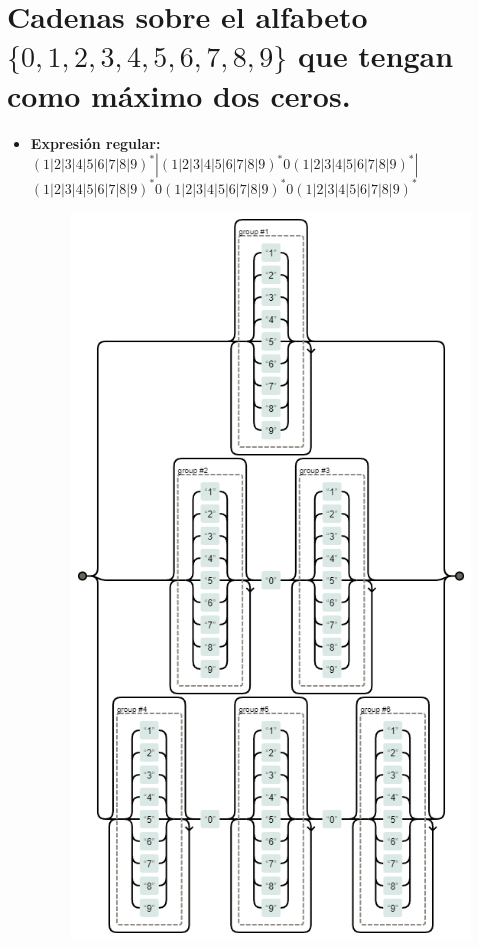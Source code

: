 \documentclass[11pt]{report}
\begin{document}
\section{Cadenas sobre el alfabeto \texorpdfstring{$\{0,1,2,3,4,5,6,7,8,9\}$}{\{0,1,2,3,4,5,6,7,8,9\}} que tengan como máximo dos ceros.}
\begin{itemize}
  \item \textbf{Expresión regular:} $(1|2|3|4|5|6|7|8|9)^*|(1|2|3|4|5|6|7|8|9)^*0(1|2|3|4|5|6|7|8|9)^*|$ \newline $(1|2|3|4|5|6|7|8|9)^*0(1|2|3|4|5|6|7|8|9)^*0(1|2|3|4|5|6|7|8|9)^*$
    \begin{figure}[H]
      \centering
      \includegraphics[scale=0.5]{img/op_basicos_09.png}

\end{figure}
\end{itemize}
\end{document}
